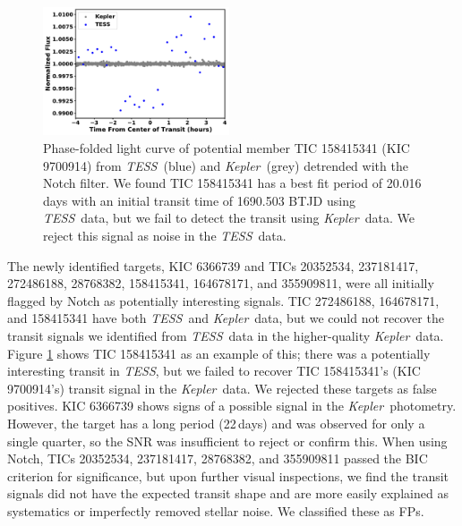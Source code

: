 \documentclass[twocolumn, linenumbers]{aastex631}
\newcommand{\kepler}{{\it Kepler}}
\newcommand{\tess}{\textit{TESS}}
\begin{document}
\begin{figure}[tb]
    \centering
    \includegraphics[width=0.49\textwidth]{layeredKTLC.pdf}
    \caption{Phase-folded light curve of potential member TIC 158415341 (KIC 9700914) from \tess\ (blue) and \kepler\ (grey) detrended with the Notch filter. We found TIC 158415341 has a best fit period of 20.016 days with an initial transit time of 1690.503 BTJD using \tess\ data, but we fail to detect the transit using \kepler\ data. We reject this signal as noise in the \tess\ data.}
    \label{fig:interestingtransits}
\end{figure}

The newly identified targets, KIC 6366739 and TICs 20352534, 237181417, 272486188, 28768382, 158415341, 164678171, and 355909811, were all initially flagged by Notch as potentially interesting signals. TIC 272486188, 164678171, and 158415341 have both \tess\ and \kepler\ data, but we could not recover the transit signals we identified from \tess\ data in the higher-quality \kepler\ data. Figure \ref{fig:interestingtransits} shows TIC 158415341 as an example of this; there was a potentially interesting transit in \tess, but we failed to recover TIC 158415341's (KIC 9700914's) transit signal in the \kepler\ data. We rejected these targets as false positives. KIC 6366739 shows signs of a possible signal in the \kepler\ photometry. However, the target has a long period (22\,days) and was observed for only a single quarter, so the SNR was insufficient to reject or confirm this. When using Notch, TICs 20352534, 237181417, 28768382, and 355909811 passed the BIC criterion for significance, but upon further visual inspections, we find the transit signals did not have the expected transit shape and are more easily explained as systematics or imperfectly removed stellar noise. We classified these as FPs. %
\end{document}
